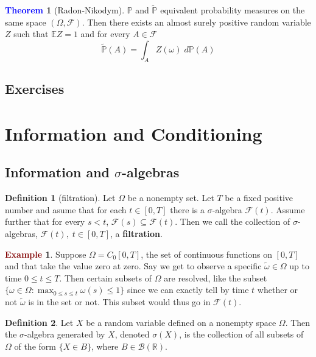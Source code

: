 \documentclass[11pt]{article}
\theoremstyle{definition}
\theoremstyle{definition}
\newcommand{\R}[0]{\mathbb{R}}
\newtheorem{theorem}{\textcolor{blue}{Theorem}}
\theoremstyle{definition}
\newtheorem{definition}{\textcolor{OliveGreen}{Definition}}
\newtheorem{ex}{\textcolor{Maroon}{Example}}
\theoremstyle{remark}
\begin{document}
\begin{theorem}[Radon-Nikodym]
    $\mathbb{P}$ and $\tilde{\mathbb{P}}$ equivalent probability measures on the same space $(\Omega, \mathcal{F})$.
    Then there exists an almost surely positive random variable $Z$ such that $\mathbb{E} Z = 1$ and for every $A \in \mathcal{F}$ 
    \[
        \tilde{\mathbb{P}}(A) = \int_A Z(\omega) \; d \mathbb{P}(A)
    \]  
    
\end{theorem}


\subsection{Exercises}


\section{Information and Conditioning}

\subsection{Information and $\sigma$-algebras}

\begin{definition}[filtration]
    Let $\Omega$ be a nonempty set. Let $T$ be a fixed positive number and asume that for each
    $t \in [0, T]$ there is a $\sigma$-algebra $\mathcal{F}(t)$. Assume further that for every $s < t$,
    $\mathcal{F}(s) \subseteq \mathcal{F}(t)$. Then we call the collection of $\sigma$-algebras, $\mathcal{F}(t), \; t \in [0, T]$,
    a \textbf{filtration}.         
\end{definition}

\begin{ex} \leavevmode
    
    Suppose $\Omega = C_0[0, T]$, the set of continuous functions on $[0, T]$ and that take the value zero
    at zero. Say we get to observe a specific $\tilde{\omega} \in \Omega$ up to time $0 \leq t \leq T$.
    Then certain subsets of $\Omega$ are resolved, like the subset $\{\omega \in \Omega : \max_{0 \leq s \leq t} \omega(s) \leq 1\}$  
    since we can exactly tell by time $t$ whether or not $\tilde{\omega}$ is in the set or not. This subset
    would thus go in $\mathcal{F}(t)$.    
\end{ex}

\begin{definition}
    Let $X$ be a random variable defined on a nonempty space $\Omega$. Then the $\sigma$-algebra generated
    by $X$, denoted $\sigma(X)$, is the collection of all subsets of $\Omega$ of the form $\{X \in B\}$,
    where $B \in \mathcal{B}(\R)$.        
\end{definition}
\end{document}
